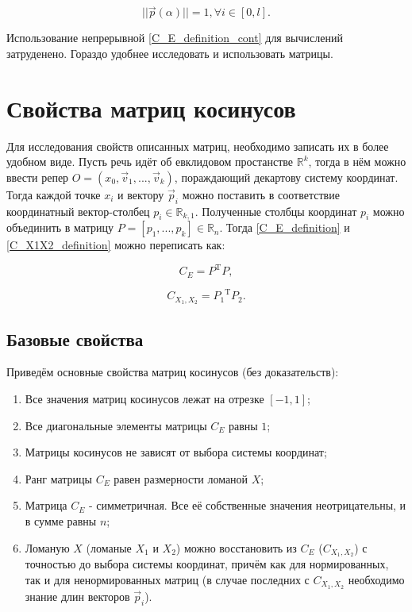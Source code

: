 \begin{equation}
	||\vec{p}(\alpha)|| = 1, \forall{i} \in [0, l].
	\label{normalized_definition_cont}
\end{equation}

Использование непрерывной \ref{C_E_definition_cont} для вычислений затруденено. Гораздо удобнее исследовать и использовать матрицы.

\section{Свойства матриц косинусов}

Для исследования свойств описанных матриц, необходимо записать их в более удобном виде. Пусть речь идёт об евклидовом простанстве $\mathbb{R}^{k}$, тогда в нём можно ввести репер $O = (x_0, \vec{v}_1, ..., \vec{v}_k)$, пораждающий декартову систему координат. Тогда каждой точке $x_i$ и вектору $\vec{p}_i$ можно поставить в соответствие координатный вектор-столбец $p_i \in \mathbb{R}_{k,1}$. Полученные столбцы координат $p_i$ можно объединить в матрицу $P = [p_1, ..., p_k] \in \mathbb{R}_{n}$. Тогда \ref{C_E_definition} и \ref{C_X1X2_definition} можно переписать как:

\begin{equation}
	C_E = P^\mathrm{T}P,
	\label{C_E_calc}
\end{equation}

\begin{equation}
	C_{X_1, X_2} = {P_1}^\mathrm{T}{P_2}.
	\label{C_X1X2_calc}
\end{equation}

\subsection{Базовые свойства}

Приведём основные свойства матриц косинусов (без доказательств):
\begin{enumerate}
\item Все значения матриц косинусов лежат на отрезке $[-1, 1]$;
\item Все диагональные элементы матрицы $C_E$ равны $1$;
\item Матрицы косинусов не зависят от выбора системы координат;
\item Ранг матрицы $C_E$ равен размерности ломаной $X$;
\item Матрица $C_E$ - симметричная. Все её собственные значения неотрицательны, и в сумме равны $n$;
\item Ломаную $X$ (ломаные $X_1$ и $X_2$) можно восстановить из $C_E$ ($C_{X_1, X_2}$) с точностью до выбора системы координат, причём как для нормированных, так и для ненормированных матриц (в случае последних с $C_{X_1, X_2}$ необходимо знание длин векторов $\vec{p}_i$).
\end{enumerate}

